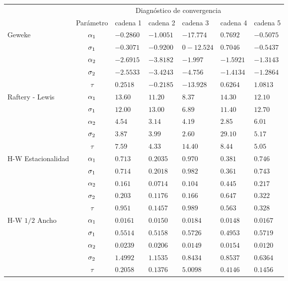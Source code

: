 \begin{table}[!h]
\centering
\begin{tabular}{|l|c|l|l|l|l|l|}
\hline
& \multicolumn{6}{|c|}{Diagnóstico de convergencia} \\
\cline{2-7}
& Parámetro & cadena 1  & cadena 2  & cadena 3 & cadena 4 & cadena 5	 \\
\hline \hline
\multirow{5}{2.5cm}{Geweke} & $\alpha_1$ & $-0.2860$ & $-1.0051$ & $-17.774$ & $0.7692$  & $ -0.5075$\\ \cline{2-7}
& $\sigma_1$& $-0.3071 $ & $-0.9200$ & $0-12.524$ & $0.7046 $ & $ -0.5437 $\\
\cline{2-7}
& $\alpha_2$& $-2.6915 $ & $-3.8182 $ & $-1.997$ & $ -1.5921$ & $-1.3143 $\\
\cline{2-7}
& $\sigma_2$& $-2.5533$ & $-3.4243$ & $-4.756$ & $ -1.4134$ & $-1.2864$\\
\cline{2-7}
& $\tau $& $0.2518  $ & $-0.2185 $ & $-13.928$ & $0.6264$ & $1.0813$\\
  \cline{1-7}
  \multirow{5}{2.5cm}{Raftery - Lewis} & $\alpha_1$ & $13.60$ & $11.20  $ & $8.37  $ & $14.30$  & $  12.10 $\\ \cline{2-7}
& $\sigma_1$& $12.00 $ & $13.00 $ & $6.89$ & $11.40$ & $ 12.70 $\\
\cline{2-7}
& $\alpha_2$ & $4.54  $ & $3.14  $ & $4.19 $ & $2.85$ & $6.01 $\\
\cline{2-7}
& $\sigma_2$& $3.87 $ & $3.99$ & $2.60 $ & $29.10 $ & $5.17$\\
\cline{2-7}
& $\tau $& $7.59 $ & $4.33 $ & $14.40$ & $ 8.44 $ & $ 5.05$\\
  \cline{1-7}
  \multirow{5}{2.5cm}{H-W Estacionalidad} & $\alpha_1$ & $0.713$ & $0.2035  $ & $ 0.970$ & $0.381$  & $0.746$\\ \cline{2-7}
& $\sigma_1$& $0.714  $ & $0.2018  $ & $0.982$ & $0.361$ & $0.743$\\
\cline{2-7}
& $\alpha_2$& $0.161$ & $0.0714$ & $0.104$ & $0.445$ & $0.217$\\
\cline{2-7}
& $\sigma_2$& $0.203 $ & $0.1176 $ & $0.166$ & $0.647$ & $0.322$\\
\cline{2-7}
& $\tau$& $0.951 $ & $0.1457  $ & $0.989$ & $0.563$ & $0.328$\\
  \cline{1-7}
  \multirow{5}{2.5cm}{H-W $1/2$ Ancho} & $\alpha_1$ & $0.0161$ & $0.0150 $ & $0.0184$ & $0.0148 $  & $ 0.0167 $\\ \cline{2-7}
& $\sigma_1$& $0.5514 $ & $0.5158$ & $0.5726$ & $0.4953$ & $0.5719$\\
\cline{2-7}
& $\alpha_2$& $0.0239 $ & $0.0206$ & $0.0149$ & $0.0154$ & $0.0120$\\
\cline{2-7}
& $\sigma_2$& $1.4992$ & $1.1535$ & $0.8434$ & $ 0.8537$ & $0.6364$\\
\cline{2-7}
& $\tau$& $0.2058  $ & $0.1376$ & $5.0098 $ & $0.4146$ & $0.1456$\\
  \cline{1-7}


\end{tabular}
\end{table}
